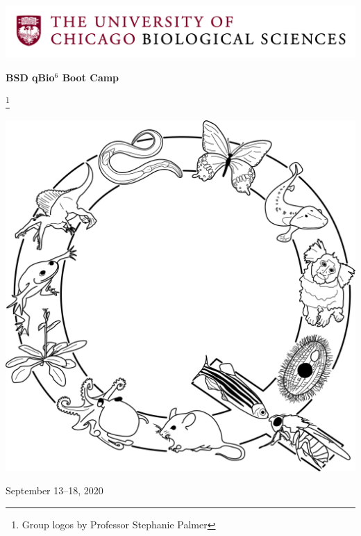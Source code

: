 \documentclass{article}
\newcommand\blfootnote[1]{%
  \begingroup
  \renewcommand\thefootnote{}\footnote{#1}%
  \addtocounter{footnote}{-1}%
  \endgroup
}
\begin{document}
\begin{centering}
\includegraphics[width=\linewidth]{BSDLogo.jpg}

\vspace{0.11in}

\Huge{\textbf{BSD qBio$^6$ Boot Camp}}

\blfootnote{Group logos by Professor Stephanie Palmer}

\vspace{0.1in}

\includegraphics[width=0.95\linewidth]{../../logo_group/Q.png}


\vspace{0.2in}

\Large{September 13--18, 2020}\\

\end{centering}
\end{document}
